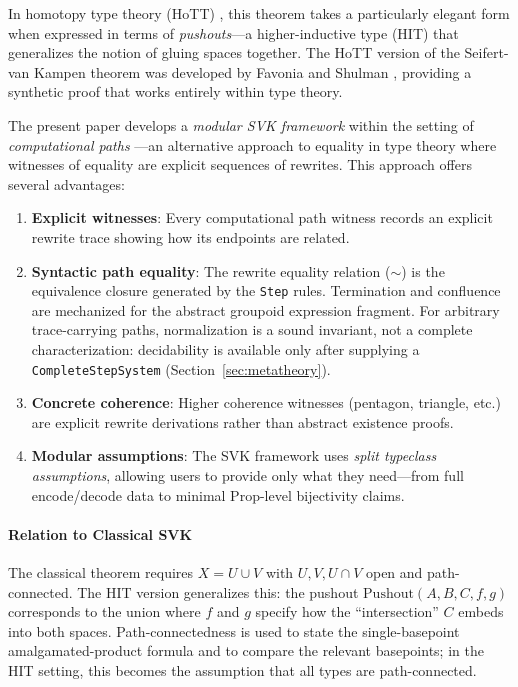 \documentclass{lmcs}
\theoremstyle{definition}
\theoremstyle{plain}
\theoremstyle{remark}
\newcommand{\RwEq}{\sim}
\newcommand{\Pushout}{\mathrm{Pushout}}
\begin{document}
In homotopy type theory (HoTT) \cite{HoTTBook2013}, this theorem takes a particularly elegant form when expressed in terms of \emph{pushouts}---a higher-inductive type (HIT) that generalizes the notion of gluing spaces together. The HoTT version of the Seifert-van Kampen theorem was developed by Favonia and Shulman \cite{FavoniaShulman2016}, providing a synthetic proof that works entirely within type theory.

The present paper develops a \emph{modular SVK framework} within the setting of \emph{computational paths} \cite{Queiroz2016Paths, Ramos2017IdentityPaths}---an alternative approach to equality in type theory where witnesses of equality are explicit sequences of rewrites. This approach offers several advantages:

\begin{enumerate}
    \item \textbf{Explicit witnesses}: Every computational path witness records an explicit rewrite trace showing how its endpoints are related.

    \item \textbf{Syntactic path equality}: The rewrite equality relation
    ($\RwEq$) is the equivalence closure generated by the \texttt{Step} rules.
    Termination and confluence are mechanized for the abstract groupoid
    expression fragment.  For arbitrary trace-carrying paths, normalization is
    a sound invariant, not a complete characterization: decidability is
    available only after supplying a \texttt{CompleteStepSystem}
    (Section~\ref{sec:metatheory}).

    \item \textbf{Concrete coherence}: Higher coherence witnesses (pentagon, triangle, etc.) are explicit rewrite derivations rather than abstract existence proofs.

    \item \textbf{Modular assumptions}: The SVK framework uses \emph{split typeclass assumptions}, allowing users to provide only what they need---from full encode/decode data to minimal Prop-level bijectivity claims.
\end{enumerate}

\paragraph{Relation to Classical SVK} The classical theorem requires $X = U \cup V$ with $U, V, U \cap V$ open and path-connected. The HIT version generalizes this: the pushout $\Pushout(A, B, C, f, g)$ corresponds to the union where $f$ and $g$ specify how the ``intersection'' $C$ embeds into both spaces. Path-connectedness is used to state the single-basepoint amalgamated-product formula and to compare the relevant basepoints; in the HIT setting, this becomes the assumption that all types are path-connected.
\end{document}
